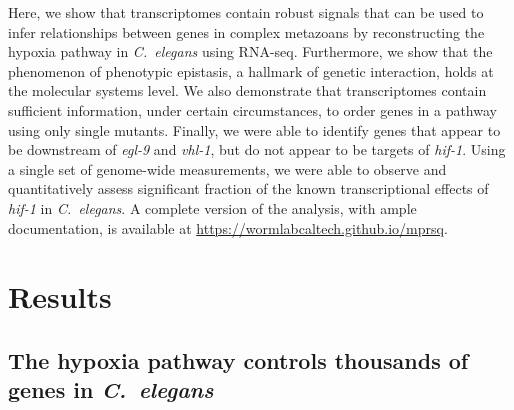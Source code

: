 \documentclass[9pt,twocolumn,twoside,lineno]{pnas-new}
\newcommand{\cel}{\emph{C.~elegans}}
\newcommand{\gene}[1]{\emph{#1}}
\begin{document}
Here, we show that transcriptomes contain robust signals that can be
used to infer relationships between genes in complex metazoans by reconstructing
the hypoxia pathway in \cel{} using RNA-seq.
Furthermore, we show that the phenomenon of phenotypic epistasis, a hallmark of
genetic interaction, holds at the molecular systems level.
We also demonstrate that transcriptomes contain sufficient information, under
certain circumstances, to order genes in a pathway using only single mutants.
Finally, we were able to identify genes that appear to be downstream of \gene{egl-9}
and \gene{vhl-1}, but do not appear to be targets of \gene{hif-1}.
Using a single set of genome-wide measurements, we were able to observe and
quantitatively assess  significant fraction of the known transcriptional
effects of \gene{hif-1} in \cel{}.
A complete version of the analysis, with ample documentation, is available at
\url{https://wormlabcaltech.github.io/mprsq}.

\section*{Results}
\subsection*{The hypoxia pathway controls thousands of genes in \cel{}}
\label{sub:summary}
\end{document}
